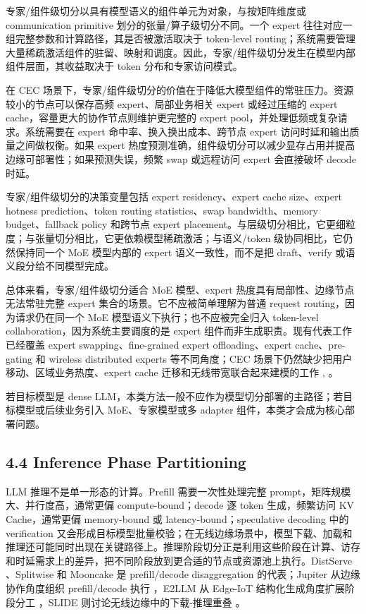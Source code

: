 专家/组件级切分以具有模型语义的组件单元为对象，与按矩阵维度或 communication primitive 划分的张量/算子级切分不同。一个 expert 往往对应一组完整参数和计算路径，其是否被激活取决于 token-level routing；系统需要管理大量稀疏激活组件的驻留、映射和调度。因此，专家/组件级切分发生在模型内部组件层面，其收益取决于 token 分布和专家访问模式。

在 CEC 场景下，专家/组件级切分的价值在于降低大模型组件的常驻压力。资源较小的节点可以保存高频 expert、局部业务相关 expert 或经过压缩的 expert cache，容量更大的协作节点则维护更完整的 expert pool，并处理低频或复杂请求。系统需要在 expert 命中率、换入换出成本、跨节点 expert 访问时延和输出质量之间做权衡。如果 expert 热度预测准确，组件级切分可以减少显存占用并提高边缘可部署性；如果预测失误，频繁 swap 或远程访问 expert 会直接破坏 decode 时延。

专家/组件级切分的决策变量包括 expert residency、expert cache size、expert hotness prediction、token routing statistics、swap bandwidth、memory budget、fallback policy 和跨节点 expert placement。与层级切分相比，它更细粒度；与张量切分相比，它更依赖模型稀疏激活；与语义/token 级协同相比，它仍然保持同一个 MoE 模型内部的 expert 语义一致性，而不是把 draft、verify 或语义段分给不同模型完成。

总体来看，专家/组件级切分适合 MoE 模型、expert 热度具有局部性、边缘节点无法常驻完整 expert 集合的场景。它不应被简单理解为普通 request routing，因为请求仍在同一个 MoE 模型语义下执行；也不应被完全归入 token-level collaboration，因为系统主要调度的是 expert 组件而非生成职责。现有代表工作已经覆盖 expert swapping、fine-grained expert offloading、expert cache、pre-gating 和 wireless distributed experts 等不同角度；CEC 场景下仍然缺少把用户移动、区域业务热度、expert cache 迁移和无线带宽联合起来建模的工作 \cite{yu2026taming}, \cite{xue2025wdmoe}。

若目标模型是 dense LLM，本类方法一般不应作为模型切分部署的主路径；若目标模型或后续业务引入 MoE、专家模型或多 adapter 组件，本类才会成为核心部署问题。
\subsection*{4.4 Inference Phase Partitioning}
LLM 推理不是单一形态的计算。Prefill 需要一次性处理完整 prompt，矩阵规模大、并行度高，通常更偏 compute-bound；decode 逐 token 生成，频繁访问 KV Cache，通常更偏 memory-bound 或 latency-bound；speculative decoding 中的 verification 又会形成目标模型批量校验；在无线边缘场景中，模型下载、加载和推理还可能同时出现在关键路径上。推理阶段切分正是利用这些阶段在计算、访存和时延需求上的差异，把不同阶段放到更合适的节点或资源池上执行。DistServe \cite{zhong2024distserve}、Splitwise \cite{patel2024splitwise} 和 Mooncake \cite{qin2025mooncake} 是 prefill/decode disaggregation 的代表；Jupiter 从边缘协作角度组织 prefill/decode 执行 \cite{ye2025jupiter}，E2LLM 从 Edge-IoT 结构化生成角度扩展阶段分工 \cite{feng20262}，SLIDE 则讨论无线边缘中的下载-推理重叠 \cite{qu2026slide}。

